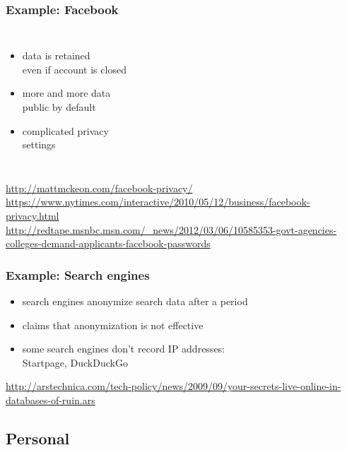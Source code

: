 \documentclass[dvipsnames]{beamer}
\theoremstyle{plain}
\begin{document}
\begin{frame}
  \frametitle{Example: Facebook}

  \begin{columns}

    \begin{itemize}
      \item data is retained\\
        even if account is closed
      \item more and more data\\
        public by default
      \item complicated privacy\\
        settings
    \end{itemize}
  \end{columns}

  \medskip
  \tiny{\url{http://mattmckeon.com/facebook-privacy/}}\\
  \tiny{\url{https://www.nytimes.com/interactive/2010/05/12/business/facebook-privacy.html}}\\
  \tiny{\url{http://redtape.msnbc.msn.com/_news/2012/03/06/10585353-govt-agencies-colleges-demand-applicants-facebook-passwords}}\\
\end{frame}

\begin{frame}
  \frametitle{Example: Search engines}

  \begin{itemize}
    \item search engines anonymize search data after a period
    \item claims that anonymization is not effective

    \medskip
    \item some search engines don't record IP addresses:\\
      Startpage, DuckDuckGo
  \end{itemize}

  \medskip
  \tiny{\url{http://arstechnica.com/tech-policy/news/2009/09/your-secrets-live-online-in-databases-of-ruin.ars}}\\
\end{frame}

\subsection{Personal}
\end{document}
